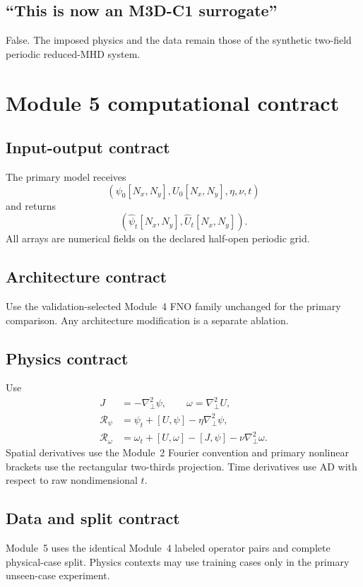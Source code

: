 \documentclass[11pt]{article}
\newcommand{\Lap}{\nabla_\perp^2}
\newcommand{\Rpsi}{\mathcal{R}_{\psi}}
\newcommand{\Romega}{\mathcal{R}_{\omega}}
\begin{document}
\subsection{``This is now an M3D-C1 surrogate''}
False. The imposed physics and the data remain those of the synthetic two-field periodic reduced-MHD system.

\section{Module 5 computational contract}
\label{sec:contract}

\subsection{Input-output contract}
The primary model receives
\begin{equation}
(\psi_0[N_x,N_y],U_0[N_x,N_y],\eta,\nu,t)
\end{equation}
and returns
\begin{equation}
(\widehat\psi_t[N_x,N_y],\widehat U_t[N_x,N_y]).
\end{equation}
All arrays are numerical fields on the declared half-open periodic grid.

\subsection{Architecture contract}
Use the validation-selected Module~4 FNO family unchanged for the primary comparison. Any architecture modification is a separate ablation.

\subsection{Physics contract}
Use
\begin{align}
J&=-\Lap\psi,\qquad \omega=\Lap U,\\
\Rpsi&=\psi_t+[U,\psi]-\eta\Lap\psi,\\
\Romega&=\omega_t+[U,\omega]-[J,\psi]-\nu\Lap\omega.
\end{align}
Spatial derivatives use the Module~2 Fourier convention and primary nonlinear brackets use the rectangular two-thirds projection. Time derivatives use AD with respect to raw nondimensional $t$.

\subsection{Data and split contract}
Module~5 uses the identical Module~4 labeled operator pairs and complete physical-case split. Physics contexts may use training cases only in the primary unseen-case experiment.
\end{document}
